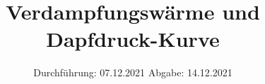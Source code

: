 

\subject{V 203}
\title{Verdampfungswärme und Dapfdruck-Kurve}
\date{%
  Durchführung: 07.12.2021
  \hspace{3em}
  Abgabe: 14.12.2021
}



\maketitle
\thispagestyle{empty}
\tableofcontents
\newpage






\printbibliography{}


